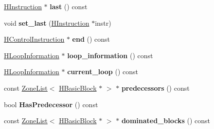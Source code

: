 \begin{DoxyCompactItemize}
\item 
\hyperlink{classv8_1_1internal_1_1_h_instruction}{H\+Instruction} $\ast$ {\bfseries last} () const \hypertarget{classv8_1_1internal_1_1_h_basic_block_a25009e7a70ac6b109d267b8cae72beaa}{}\label{classv8_1_1internal_1_1_h_basic_block_a25009e7a70ac6b109d267b8cae72beaa}

\item 
void {\bfseries set\+\_\+last} (\hyperlink{classv8_1_1internal_1_1_h_instruction}{H\+Instruction} $\ast$instr)\hypertarget{classv8_1_1internal_1_1_h_basic_block_afd482b3c6294971bc5a63f7c404e3fa3}{}\label{classv8_1_1internal_1_1_h_basic_block_afd482b3c6294971bc5a63f7c404e3fa3}

\item 
\hyperlink{classv8_1_1internal_1_1_h_control_instruction}{H\+Control\+Instruction} $\ast$ {\bfseries end} () const \hypertarget{classv8_1_1internal_1_1_h_basic_block_a987397be6e40d47d1e93a493dbeff824}{}\label{classv8_1_1internal_1_1_h_basic_block_a987397be6e40d47d1e93a493dbeff824}

\item 
\hyperlink{classv8_1_1internal_1_1_h_loop_information}{H\+Loop\+Information} $\ast$ {\bfseries loop\+\_\+information} () const \hypertarget{classv8_1_1internal_1_1_h_basic_block_a990e4700b87293b12010a034d1162898}{}\label{classv8_1_1internal_1_1_h_basic_block_a990e4700b87293b12010a034d1162898}

\item 
\hyperlink{classv8_1_1internal_1_1_h_loop_information}{H\+Loop\+Information} $\ast$ {\bfseries current\+\_\+loop} () const \hypertarget{classv8_1_1internal_1_1_h_basic_block_a39ee504d2cc7beecc301a549934689a5}{}\label{classv8_1_1internal_1_1_h_basic_block_a39ee504d2cc7beecc301a549934689a5}

\item 
const \hyperlink{classv8_1_1internal_1_1_zone_list}{Zone\+List}$<$ \hyperlink{classv8_1_1internal_1_1_h_basic_block}{H\+Basic\+Block} $\ast$ $>$ $\ast$ {\bfseries predecessors} () const \hypertarget{classv8_1_1internal_1_1_h_basic_block_ac4b2eab10760026e820cfc9ff7ef4f34}{}\label{classv8_1_1internal_1_1_h_basic_block_ac4b2eab10760026e820cfc9ff7ef4f34}

\item 
bool {\bfseries Has\+Predecessor} () const \hypertarget{classv8_1_1internal_1_1_h_basic_block_a6dbb18dee269a0e810ab275fab41bbff}{}\label{classv8_1_1internal_1_1_h_basic_block_a6dbb18dee269a0e810ab275fab41bbff}

\item 
const \hyperlink{classv8_1_1internal_1_1_zone_list}{Zone\+List}$<$ \hyperlink{classv8_1_1internal_1_1_h_basic_block}{H\+Basic\+Block} $\ast$ $>$ $\ast$ {\bfseries dominated\+\_\+blocks} () const \hypertarget{classv8_1_1internal_1_1_h_basic_block_a131312179b10c29c67d199c7cfc30a6d}{}\label{classv8_1_1internal_1_1_h_basic_block_a131312179b10c29c67d199c7cfc30a6d}


\end{DoxyCompactItemize}
